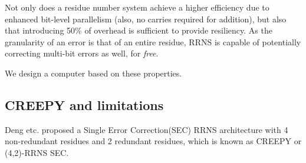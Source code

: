 \documentclass{sig-alternate}
\begin{document}
Not only does a residue number system achieve a higher efficiency due to enhanced bit-level parallelism (also, no carries required for addition), but also that introducing 50\% of overhead is sufficient to provide resiliency. As the granularity of an error is that of an entire residue, RRNS is capable of potentially correcting multi-bit errors as well, for \textit{free}.

We design a computer based on these properties.

\subsection{CREEPY and limitations}
\label{sub:CREEPY}
Deng etc.\cite{DengICRC16,DengTACO18,SrikanthHPCA18} proposed a Single Error Correction(SEC) RRNS architecture with 4 non-redundant residues and 2 redundant residues, which is known as CREEPY or (4,2)-RRNS SEC. 
\end{document}
